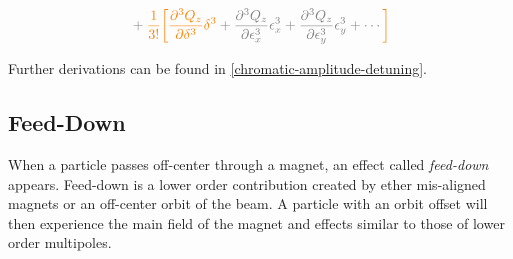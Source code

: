 \begin{equation}
\begin{aligned}
                                             &\color{gray}+ \textcolor{orange}{\frac{1}{3!}
                                             \biggl[}
                                                  \textcolor{orange}{\frac{\partial^3 Q_z}{\partial \delta^3} \delta^{3}}
                                                  + \frac{\partial^{3} Q_z}{\partial \epsilon_{x}^{3}}  \epsilon_{x}^{3} 
                                                  + \frac{\partial^{3} Q_z}{\partial \epsilon_{y}^{3}}  \epsilon_{y}^{3} 
                                            + \cdots \textcolor{orange}{\biggr]}\\
\end{aligned}
\label{eq:detuning_effects:decapole_chromatic_ampdet}
\end{equation}

Further derivations can be found in \cref{chromatic-amplitude-detuning}.


\subsection{Feed-Down}

When a particle passes off-center through a magnet, an effect called \textit{feed-down} appears.
Feed-down is a lower order contribution created by ether mis-aligned magnets or an off-center orbit
of the beam.
A particle with an orbit offset will then experience the main field of the magnet and effects
similar to those of lower order multipoles.